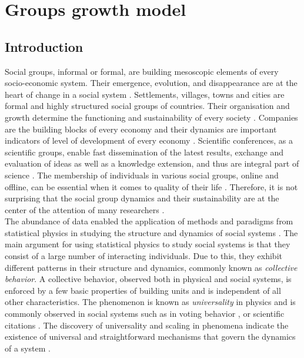 
\chapter{Groups growth model} %

\section{Introduction}

Social groups, informal or formal, are building mesoscopic elements of every socio-economic system. Their emergence, evolution, and disappearance are at the heart of change in a social system \cite{}. Settlements, villages, towns and cities are formal and highly structured social groups of countries. Their organisation and growth determine the functioning and sustainability of every society \cite{barthelemy2016structure}. Companies are the building blocks of every economy and their dynamics are important indicators of level of development of every economy \cite{hidalgo2009building}. Scientific conferences, as a scientific groups, enable fast dissemination of the latest results, exchange and evaluation of ideas as well as a knowledge extension, and thus are integral part of science \cite{smiljanic2016theoretical}. The membership of individuals in various social groups, online and offline, can be essential when it comes to quality of their life \cite{montazeri2001anxiety, davison2000talks, cho2012tea}. Therefore, it is not surprising that the social group dynamics and their sustainability are at the center of the attention of many researchers \cite{aral2012identifying,gonzalez2013broadcasters, torok2013opinions, yasseri2012dynamics}.\\

The abundance of data enabled the application of methods and paradigms from statistical physics in studying the structure and dynamics of social systems \cite{castellano2009statistical}. The main argument for using statistical physics to study social systems is that they consist of a large number of interacting individuals. Due to this, they exhibit different patterns in their structure and dynamics, commonly known as \textit{collective behavior}. A collective behavior, observed both in physical and social systems, is enforced by a few basic properties of building units and is independent of all other characteristics. The phenomenon is known as \textit{universality} in physics and is commonly observed in social systems such as in voting behavior \cite{chatterjee2013universality}, or scientific citations \cite{radicchi2008universality}. The discovery of universality and scaling in phenomena indicate the existence of universal and straightforward mechanisms that govern the dynamics of a system \cite{}.\\  


